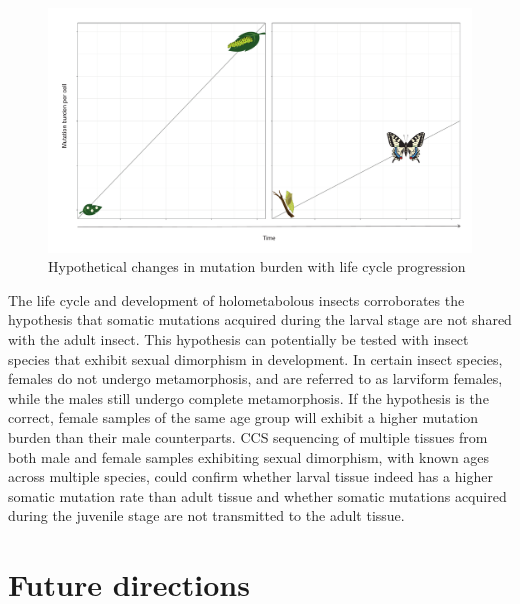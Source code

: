 \begin{figure}[h!]
\caption{Hypothetical changes in mutation burden with life cycle progression}
\label{figure:lepidoptera-mutation-burden}
\begin{centering}
\includegraphics[width=\textwidth]{lepidoptera_mutation_burden.pdf} 
\end{centering}
\end{figure}

The life cycle and development of holometabolous insects corroborates the hypothesis that somatic mutations acquired during the larval stage are not shared with the adult insect. This hypothesis can potentially be tested with insect species that exhibit sexual dimorphism in development. In certain insect species, females do not undergo metamorphosis, and are referred to as larviform females, while the males still undergo complete metamorphosis. If the hypothesis is the correct, female samples of the same age group will exhibit a higher mutation burden than their male counterparts. CCS sequencing of multiple tissues from both male and female samples exhibiting sexual dimorphism, with known ages across multiple species, could confirm whether larval tissue indeed has a higher somatic mutation rate than adult tissue and whether somatic mutations acquired during the juvenile stage are not transmitted to the adult tissue. 

\section{Future directions}

